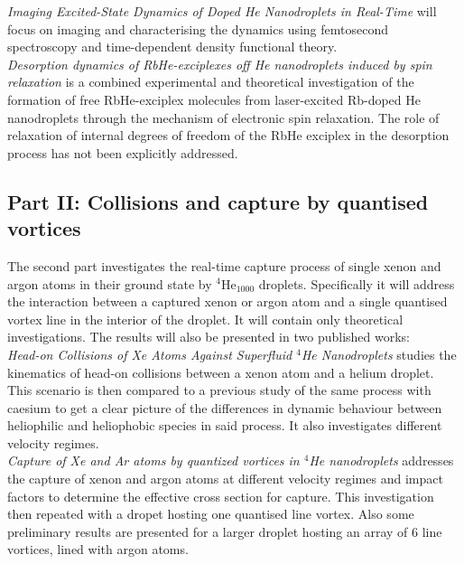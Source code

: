 \documentclass[12pt,a4paper]{book}
\begin{document}
			\emph{Imaging Excited-State Dynamics of Doped He Nanodroplets in Real-Time} will focus on imaging and characterising the dynamics using femtosecond spectroscopy and  time-dependent density functional theory.\\
		
			\emph{Desorption dynamics of RbHe-exciplexes off He nanodroplets induced by spin relaxation} is a combined experimental and theoretical investigation of the formation of free RbHe-exciplex molecules from laser-excited Rb-doped He nanodroplets through the mechanism of electronic spin relaxation. The role of relaxation of internal degrees of freedom of the RbHe exciplex in the desorption process has not been explicitly addressed.

		\subsection{Part II: Collisions and capture by quantised vortices}
			The second part investigates the real-time capture process of single xenon and argon atoms in their ground state by $^4$He$_{1000}$ droplets. Specifically it will address the interaction between a captured xenon or argon atom and a single quantised vortex line in the interior of the droplet. It will contain only theoretical investigations. The results will also be presented in two published works:\\
		
			\emph{Head-on Collisions of Xe Atoms Against Superfluid $^4\!$He Nanodroplets} studies the kinematics of head-on collisions between a xenon atom and a helium droplet. This scenario is then compared to a previous study of the same process with caesium to get a clear picture of the differences in dynamic behaviour between heliophilic and heliophobic species in said process. It also investigates different velocity regimes.\\
		
			\emph{Capture of Xe and Ar atoms by quantized vortices in $^4\!$He nanodroplets} addresses the capture of xenon and argon atoms at different velocity regimes and impact factors to determine the effective cross section for capture. This investigation then repeated with a dropet hosting one quantised line vortex. Also some preliminary results are presented for a larger droplet hosting an array of 6 line vortices, lined with argon atoms.
\end{document}
